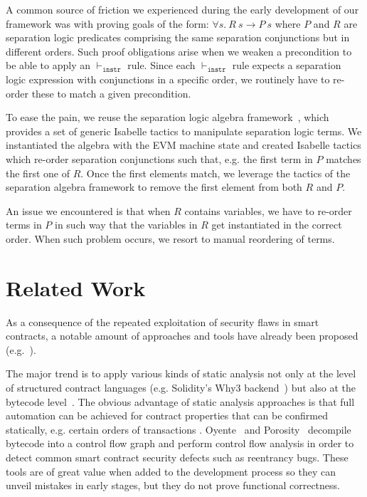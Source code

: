 \documentclass[sigplan,10pt,review]{acmart}\settopmatter{printfolios=true,printccs=false,printacmref=false}
\begin{document}
A common source of friction we experienced during the early development
of our framework was with proving goals of the form:
$\forall s.\: R~s \longrightarrow P~s$ where $P$ and $R$ are separation logic predicates
comprising the same separation conjunctions but in different orders.
Such proof obligations arise when we weaken a precondition to be
able to apply an $\vdash_\mathtt{instr}$ rule.
Since each $\vdash_\mathtt{instr}$ rule expects a separation logic expression with conjunctions
in a specific order, we routinely have to re-order these to
match a given precondition.

To ease the pain, we reuse the separation logic algebra framework~\cite{Klein_KB_12},
which provides a set of generic Isabelle tactics to manipulate separation logic terms.
We instantiated the algebra with the EVM machine state and created Isabelle tactics
which re-order separation conjunctions such that, e.g. %
the first term in $P$ matches the first one of $R$.
Once the first elements match, we leverage the tactics of the separation
algebra framework to remove the first element from both $R$ and $P$.

An issue we encountered is that when $R$ contains variables,
we have to re-order terms in $P$ in such way that the variables in $R$ get instantiated
in the correct order.
When such problem occurs, we resort to manual reordering of terms. %

\section{Related Work}
\label{sec:rwork}
%
As a consequence of the repeated exploitation of security flaws in smart contracts,
a notable amount of approaches and tools have already been proposed (e.g.~\cite{Bhargavan:2016:FVS:2993600.2993611,securify,Luu_COSH_16}).
 
The major trend is to apply various kinds of static analysis not only at the level of structured contract
languages (e.g. Solidity's Why3 backend~\cite{filliatre2013why3,Reitwiessner_16}) but also at the bytecode level~\cite{Msuiche_17,securify,Luu_COSH_16}. 
%
The obvious advantage of static analysis approaches is that full automation can be achieved for 
contract properties that can be confirmed statically, e.g. certain orders of transactions \cite{securify}.
Oyente~\cite{Luu_COSH_16} and Porosity~\cite{Msuiche_17} decompile
bytecode into a control flow graph and perform control flow analysis in order
to detect common smart contract security defects such as reentrancy bugs.
These tools are of great value when added to the development process so
they can unveil mistakes in early stages, but they do not prove functional correctness.
\end{document}
